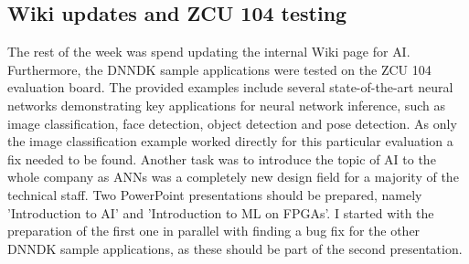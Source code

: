 \subsection{Wiki updates and ZCU 104 testing}
The rest of the week was spend updating the internal Wiki page for \ac{AI}. Furthermore, the \ac{DNNDK} sample applications were tested on the ZCU 104 evaluation board. The provided examples include several state-of-the-art neural networks demonstrating key applications for neural network inference, such as image classification, face detection, object detection and pose detection. As only the image classification example worked directly for this particular evaluation a fix needed to be found. Another task was to introduce the topic of \ac{AI} to the whole company as \acp{ANN} was a completely new design field for a majority of the technical staff. Two PowerPoint presentations should be prepared, namely 'Introduction to \ac{AI}' and 'Introduction to \ac{ML} on \acp{FPGA}'. I started with the preparation of the first one in parallel with finding a bug fix for the other \ac{DNNDK} sample applications, as these should be part of the second presentation.

